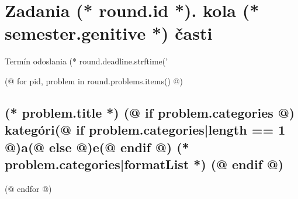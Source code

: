 \documentclass[12pt, twoside]{article}
\newcounter{volume}
\newcounter{semester}
\newcounter{round}
\newcounter{problem}
\begin{document}
    \pagestyle{main}
    \thispagestyle{first}
    \vspace*{8mm}

    {
        \section{\texorpdfstring{Zadania (* round.id *). kola (* semester.genitive *) časti}{Zadania}}
        \centering
        \vspace*{-5mm}
        Termín odoslania (* round.deadline.strftime('%
    } 
        
    \pagestyle{problems}    

    (@ for pid, problem in round.problems.items() @)%
        \setcounter{volume}{(* volume.number *)}%
        \setcounter{semester}{(* semester.number *)}%
        \setcounter{round}{(* round.number *)}%
        \setcounter{problem}{(* problem.number *)}%
        
        \subsection{%
            \texorpdfstring{%
                \large \textbf{(* problem.title *)}%
                (@ if problem.categories @)%
                \normalsize \hfill kategóri(@ if problem.categories|length == 1 @)a(@ else @)e(@ endif @) (* problem.categories|formatList *)%
                (@ endif @)
            }{%
                (* round.number *).(* problem.number *) (* problem.title *)%
            }%
        }%
    (@ endfor @)
\end{document}
